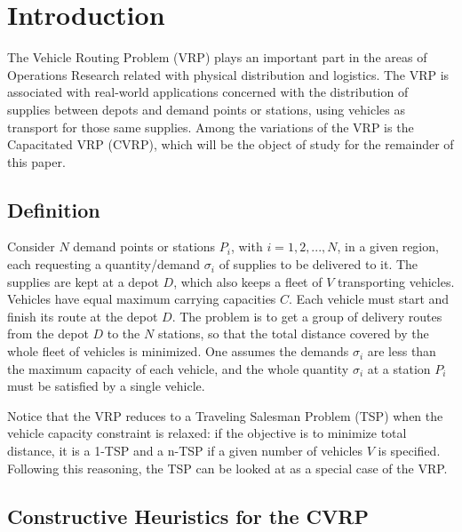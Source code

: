 \section{Introduction}
\label{sec:intro}

The Vehicle Routing Problem (VRP) plays an important part in the areas of 
Operations Research related with physical distribution and logistics. The VRP is 
associated with real-world applications concerned with the distribution of 
supplies between depots and demand points or stations, using vehicles as transport for 
those same supplies. Among the variations of the VRP is 
the Capacitated VRP (CVRP), which will be the object of study for the remainder 
of this paper.

\subsection{Definition}
\label{subsec:definition}

Consider $N$ demand points or stations $P_i$, with $i = 1, 2, ..., N$, in a 
given region, each requesting a 
quantity\slash demand $\sigma_i$ of supplies to be 
delivered to it. The supplies are kept at a depot $D$, which also keeps a 
fleet of $V$ transporting vehicles. Vehicles have equal maximum carrying capacities 
$C$. Each vehicle must start and finish its route at the depot $D$. The 
problem is to get a group of delivery routes from the depot $D$ to the $N$ 
stations, so that the total distance covered by the whole fleet of 
vehicles is minimized. One assumes the demands $\sigma_i$ are less than the maximum 
capacity of each vehicle, and the whole quantity $\sigma_i$ at a station $P_i$ 
must be satisfied by a single vehicle.\vertbreak

Notice that the VRP reduces to a Traveling Salesman Problem (TSP) when the 
vehicle capacity constraint is relaxed: if the objective is to minimize 
total distance, it is a 1-TSP and a n-TSP if a given number of vehicles $V$ is 
specified. Following this reasoning, the TSP can be looked at as a special case 
of the VRP.

\subsection{Constructive Heuristics for the CVRP}
\label{subsec:constructive}

